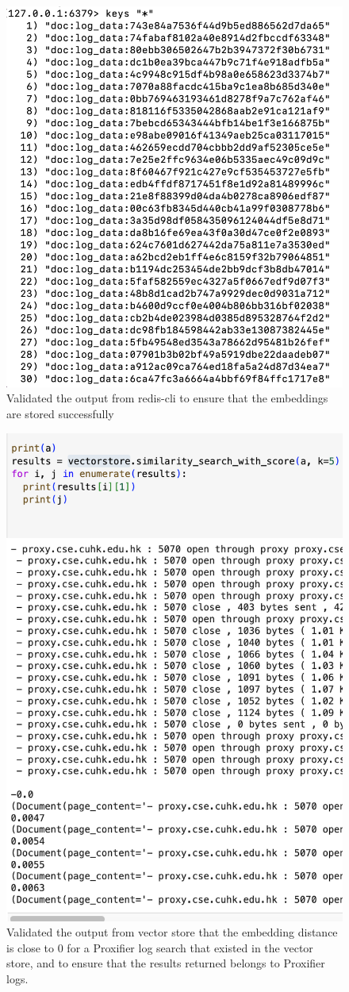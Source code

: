 \documentclass[conference]{IEEEtran}
\begin{document}
\begin{figure}
    \centering
    \includegraphics[width=0.7\linewidth]{Screen Shot 2023-11-19 at 8.35.39 PM.png}
    \caption{Validated the output from redis-cli to ensure that the embeddings are stored successfully}
    \label{fig:redis-cli}
\end{figure}

\begin{figure}
    \centering
    \includegraphics[width=0.7\linewidth]{Screen Shot 2023-11-19 at 9.00.20 PM.png}
    \caption{Validated the output from vector store that the embedding distance is close to 0 for a Proxifier log search that existed in the vector store, and to ensure that the results returned belongs to Proxifier logs.}
    \label{fig:redis-proxifier}
\end{figure}
\end{document}
